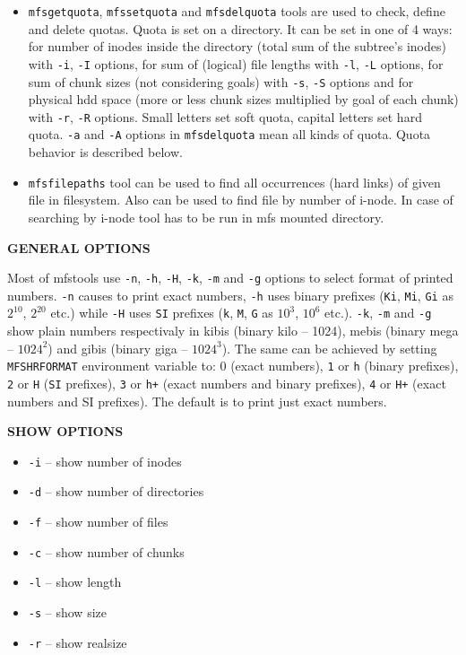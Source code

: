 \documentclass[a4paper,11pt,english]{report}
\def\code#1{\texttt{#1}}
\begin{document}
\begin{itemize}
					\item \code{mfsgetquota}, \code{mfssetquota} and  \code{mfsdelquota}  tools  are  used  to  check,
					define and delete quotas. Quota is set on a directory. It can be set in
					one of 4 ways: for number of inodes inside the directory (total sum  of
					the  subtree's  inodes)  with \code{-i}, \code{-I} options, for sum of (logical) file
					lengths with \code{-l}, \code{-L} options, for sum of chunk  sizes  (not  considering
					goals)  with  \code{-s},  \code{-S}  options and for physical hdd space (more or less
					chunk sizes multiplied by goal of each  chunk)  with  \code{-r},  \code{-R}  options.
					Small letters set soft quota, capital letters set hard quota. \code{-a} and \code{-A}
					options in \code{mfsdelquota} mean all kinds  of  quota.  Quota  behavior  is
					described below.
					
					\item \code{mfsfilepaths} tool can be used to find all occurrences (hard links) of given file in filesystem.  Also can be used to find file by number of i-node. In case of searching by i-node tool has to be run in mfs mounted directory.
				\end{itemize}
				\bigskip
				
				\textbf{GENERAL OPTIONS}
				
					Most of mfstools use \code{-n}, \code{-h}, \code{-H}, \code{-k}, \code{-m} and \code{-g} options to select format
					of printed numbers. \code{-n} causes to print exact numbers,  \code{-h}  uses  binary
					prefixes  (\code{Ki}, \code{Mi}, \code{Gi} as $2^{10}$, $2^{20}$ etc.) while \code{-H} uses \code{SI} prefixes (\code{k},
					\code{M}, \code{G} as $10^3$, $10^6$ etc.). \code{-k}, \code{-m} and \code{-g} show plain numbers respectivaly
					in  kibis  (binary kilo -- 1024), mebis (binary mega -- $1024^2$) and gibis
					(binary giga -- $1024^3$).  The same can be achieved by setting  \code{MFSHRFORMAT}
					environment  variable  to:  0 (exact numbers), \code{1} or \code{h} (binary prefixes),
					\code{2} or \code{H} (\code{SI} prefixes), \code{3} or \code{h+} (exact numbers  and  binary  prefixes),
					\code{4}  or  \code{H+}  (exact  numbers and SI prefixes). The default is to
					print just exact numbers.
				\bigskip
				
				\textbf{SHOW OPTIONS}
				\begin{itemize}
					\item \code{-i}     -- show number of inodes
					\item \code{-d}     -- show number of directories
					\item \code{-f}     -- show number of files
					\item \code{-c}     -- show number of chunks
					\item \code{-l}     -- show length
					\item \code{-s}     -- show size
					\item \code{-r}     -- show realsize
				\end{itemize}
				\bigskip
				
\end{document}
